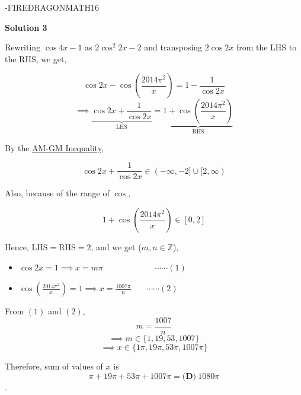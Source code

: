 \begin{enumerate}
 
-FIREDRAGONMATH16

 



\textbf{Solution 3}

Rewriting $\cos{4x} - 1$ as $2\cos^2{2x} - 2$ and transposing $2\cos{2x}$ from the LHS to the RHS, we get,

 
 \[\cos{2x} - \cos{\left(\frac{2014\pi^2}{x}\right)} = 1 - \frac{1}{\cos{2x}}\]
 \[\implies \underbrace{\cos{2x} + \frac{1}{\cos{2x}}}_{\text{LHS}} = \underbrace{1 + \cos{\left(\frac{2014\pi^2}{x}\right)}}_{\text{RHS}}\]

 By the \href{https://artofproblemsolving.com/wiki/index.php/AM-GM\_Inequality}{AM-GM Inequality},

 
 \[\cos{2x} + \frac{1}{\cos{2x}} \in (-\infty, -2] \cup [2, \infty)\]

 Also, because of the range of $\cos$,

 
 \[1 + \cos{\left(\frac{2014\pi^2}{x}\right)} \in [0, 2]\]

 Hence, $\text{LHS} = \text{RHS} = 2$, and we get ($m, n \in \mathbb{Z}$),

 
            \begin{itemize}
        \item $\cos{2x} = 1 \implies x = m\pi \hspace{75pt} \cdots\cdots (1)$
        \item $\cos{\left(\frac{2014\pi^2}{x}\right)} = 1 \implies x = \frac{1007\pi}{n} \hspace{22pt} \cdots\cdots (2)$
            \end{itemize}
            
From $(1)$ and $(2)$,
 \[m = \frac{1007}{n}\]
 \[\implies m \in \{1, 19, 53, 1007\}\]
 \[\implies x \in \{1\pi, 19\pi, 53\pi, 1007\pi\}\]

 Therefore, sum of values of $x$ is 
 \[\pi + 19\pi + 53\pi + 1007\pi = \boxed{\textbf{(D)}\ 1080\pi}\].

 


\end{enumerate}